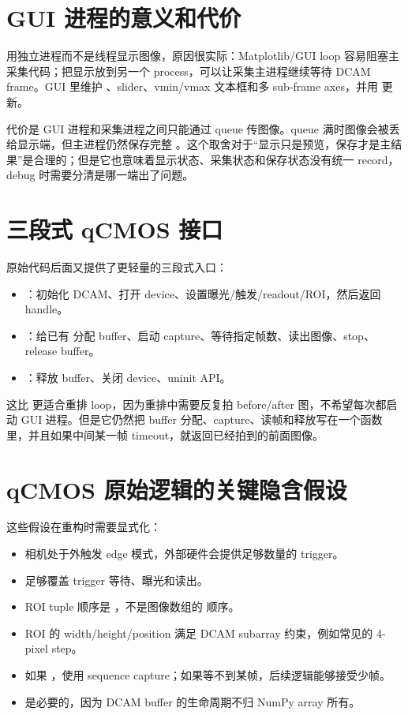 \documentclass[11pt,oneside,openany]{book}
\begin{document}
\section{GUI 进程的意义和代价}
 用独立进程而不是线程显示图像，原因很实际：Matplotlib/GUI loop 容易阻塞主采集代码；把显示放到另一个 process，可以让采集主进程继续等待 DCAM frame。GUI 里维护 、slider、vmin/vmax 文本框和多 sub-frame axes，并用  更新。

代价是 GUI 进程和采集进程之间只能通过 queue 传图像。queue 满时图像会被丢给显示端，但主进程仍然保存完整 。这个取舍对于“显示只是预览，保存才是主结果”是合理的；但是它也意味着显示状态、采集状态和保存状态没有统一 record，debug 时需要分清是哪一端出了问题。

\section{三段式 qCMOS 接口}
原始代码后面又提供了更轻量的三段式入口：
\begin{itemize}
  \item {}：初始化 DCAM、打开 device、设置曝光/触发/readout/ROI，然后返回  handle。
  \item {}：给已有  分配 buffer、启动 capture、等待指定帧数、读出图像、stop、release buffer。
  \item {}：释放 buffer、关闭 device、uninit API。
\end{itemize}
这比  更适合重排 loop，因为重排中需要反复拍 before/after 图，不希望每次都启动 GUI 进程。但是它仍然把 buffer 分配、capture、读帧和释放写在一个函数里，并且如果中间某一帧 timeout，就返回已经拍到的前面图像。

\section{qCMOS 原始逻辑的关键隐含假设}
这些假设在重构时需要显式化：
\begin{itemize}
  \item 相机处于外触发 edge 模式，外部硬件会提供足够数量的 trigger。
  \item {} 足够覆盖 trigger 等待、曝光和读出。
  \item ROI tuple 顺序是 ，不是图像数组的  顺序。
  \item ROI 的 width/height/position 满足 DCAM subarray 约束，例如常见的 4-pixel step。
  \item 如果 ，使用 sequence capture；如果等不到某帧，后续逻辑能够接受少帧。
  \item {} 是必要的，因为 DCAM buffer 的生命周期不归 NumPy array 所有。
\end{itemize}
\end{document}
